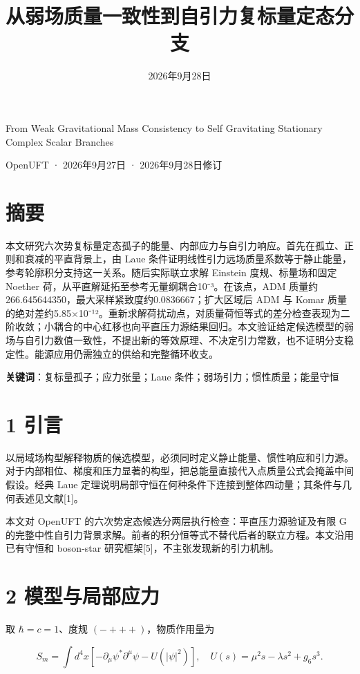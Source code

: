 \documentclass[UTF8,fontset=fandol,11pt]{ctexart}
\title{从弱场质量一致性到自引力复标量定态分支}
\author{}
\date{2026年9月28日}
\begin{document}
\maketitle

From Weak Gravitational Mass Consistency to Self Gravitating Stationary Complex Scalar Branches

OpenUFT · 2026年9月27日 · 2026年9月28日修订

\section*{摘要}

本文研究六次势复标量定态孤子的能量、内部应力与自引力响应。首先在孤立、正则和衰减的平直背景上，由 Laue 条件证明线性引力远场质量系数等于静止能量，参考轮廓积分支持这一关系。随后实际联立求解 Einstein 度规、标量场和固定 Noether 荷，从平直解延拓至参考无量纲耦合10⁻³。在该点，ADM 质量约266.645644350，最大采样紧致度约0.0836667；扩大区域后 ADM 与 Komar 质量的绝对差约5.85×10⁻¹²。重新求解荷扰动点，对质量荷恒等式的差分检查表现为二阶收敛；小耦合的中心红移也向平直压力源结果回归。本文验证给定候选模型的弱场与自引力数值一致性，不提出新的等效原理、不决定引力常数，也不证明分支稳定性。能源应用仍需独立的供给和完整循环收支。

\textbf{关键词}：复标量孤子；应力张量；Laue 条件；弱场引力；惯性质量；能量守恒

\section*{1 引言}

以局域场构型解释物质的候选模型，必须同时定义静止能量、惯性响应和引力源。对于内部相位、梯度和压力显著的构型，把总能量直接代入点质量公式会掩盖中间假设。经典 Laue 定理说明局部守恒在何种条件下连接到整体四动量；其条件与几何表述见文献[1]。

本文对 OpenUFT 的六次势定态候选分两层执行检查：平直压力源验证及有限 G 的完整中性自引力背景求解。前者的积分恒等式不替代后者的联立方程。本文沿用已有守恒和 boson-star 研究框架[5]，不主张发现新的引力机制。

\section*{2 模型与局部应力}

取 \(\hbar=c=1\)、度规 \((-+++)\)，物质作用量为

\[
S_m=\int d^4x\left[-\partial_\mu\psi^*\partial^\mu\psi
-U(|\psi|^2)\right],
\quad U(s)=\mu^2s-\lambda s^2+g_6s^3.
\]
\end{document}
